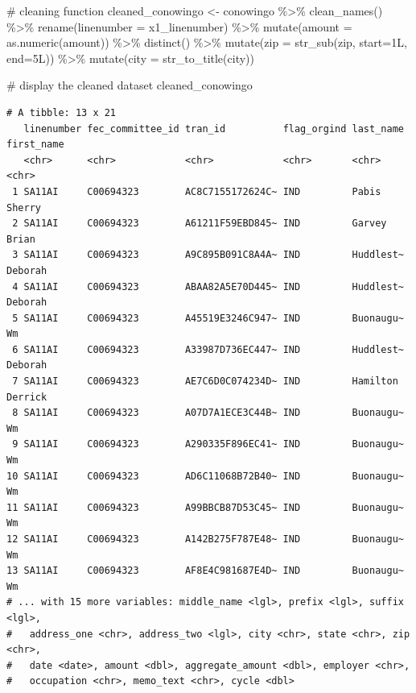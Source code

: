 \documentclass[
  letterpaper,
  DIV=11,
  numbers=noendperiod]{scrreprt}
\newenvironment{Shaded}{\begin{snugshade}}{\end{snugshade}}
\newcommand{\AttributeTok}[1]{\textcolor[rgb]{0.40,0.45,0.13}{#1}}
\newcommand{\CommentTok}[1]{\textcolor[rgb]{0.37,0.37,0.37}{#1}}
\newcommand{\FunctionTok}[1]{\textcolor[rgb]{0.28,0.35,0.67}{#1}}
\newcommand{\NormalTok}[1]{\textcolor[rgb]{0.00,0.23,0.31}{#1}}
\newcommand{\OtherTok}[1]{\textcolor[rgb]{0.00,0.23,0.31}{#1}}
\newcommand{\SpecialCharTok}[1]{\textcolor[rgb]{0.37,0.37,0.37}{#1}}
\begin{document}
\begin{Shaded}
\begin{Highlighting}[]
\CommentTok{\# cleaning function}
\NormalTok{cleaned\_conowingo }\OtherTok{\textless{}{-}}\NormalTok{ conowingo }\SpecialCharTok{\%\textgreater{}\%}
  \FunctionTok{clean\_names}\NormalTok{() }\SpecialCharTok{\%\textgreater{}\%} 
  \FunctionTok{rename}\NormalTok{(}\AttributeTok{linenumber =}\NormalTok{ x1\_linenumber) }\SpecialCharTok{\%\textgreater{}\%} 
  \FunctionTok{mutate}\NormalTok{(}\AttributeTok{amount =} \FunctionTok{as.numeric}\NormalTok{(amount)) }\SpecialCharTok{\%\textgreater{}\%} 
  \FunctionTok{distinct}\NormalTok{() }\SpecialCharTok{\%\textgreater{}\%}
  \FunctionTok{mutate}\NormalTok{(}\AttributeTok{zip =} \FunctionTok{str\_sub}\NormalTok{(zip, }\AttributeTok{start=}\NormalTok{1L, }\AttributeTok{end=}\NormalTok{5L)) }\SpecialCharTok{\%\textgreater{}\%}
  \FunctionTok{mutate}\NormalTok{(}\AttributeTok{city =} \FunctionTok{str\_to\_title}\NormalTok{(city))}
  

\CommentTok{\# display the cleaned dataset}
\NormalTok{cleaned\_conowingo}
\end{Highlighting}
\end{Shaded}

\begin{verbatim}
# A tibble: 13 x 21
   linenumber fec_committee_id tran_id          flag_orgind last_name first_name
   <chr>      <chr>            <chr>            <chr>       <chr>     <chr>     
 1 SA11AI     C00694323        AC8C7155172624C~ IND         Pabis     Sherry    
 2 SA11AI     C00694323        A61211F59EBD845~ IND         Garvey    Brian     
 3 SA11AI     C00694323        A9C895B091C8A4A~ IND         Huddlest~ Deborah   
 4 SA11AI     C00694323        ABAA82A5E70D445~ IND         Huddlest~ Deborah   
 5 SA11AI     C00694323        A45519E3246C947~ IND         Buonaugu~ Wm        
 6 SA11AI     C00694323        A33987D736EC447~ IND         Huddlest~ Deborah   
 7 SA11AI     C00694323        AE7C6D0C074234D~ IND         Hamilton  Derrick   
 8 SA11AI     C00694323        A07D7A1ECE3C44B~ IND         Buonaugu~ Wm        
 9 SA11AI     C00694323        A290335F896EC41~ IND         Buonaugu~ Wm        
10 SA11AI     C00694323        AD6C11068B72B40~ IND         Buonaugu~ Wm        
11 SA11AI     C00694323        A99BBCB87D53C45~ IND         Buonaugu~ Wm        
12 SA11AI     C00694323        A142B275F787E48~ IND         Buonaugu~ Wm        
13 SA11AI     C00694323        AF8E4C981687E4D~ IND         Buonaugu~ Wm        
# ... with 15 more variables: middle_name <lgl>, prefix <lgl>, suffix <lgl>,
#   address_one <chr>, address_two <lgl>, city <chr>, state <chr>, zip <chr>,
#   date <date>, amount <dbl>, aggregate_amount <dbl>, employer <chr>,
#   occupation <chr>, memo_text <chr>, cycle <dbl>
\end{verbatim}
\end{document}
